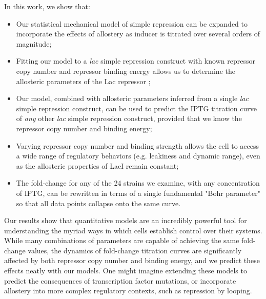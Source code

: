 In this work, we show that:  
\begin{itemize}
	\item Our statistical mechanical model of simple repression can be expanded to incorporate the effects of allostery as inducer is titrated over several orders of magnitude;
	\item Fitting our model to a \textit{lac} simple repression construct with known repressor copy number and repressor binding energy allows us to determine the allosteric parameters of the Lac repressor ;
	\item Our model, combined with allosteric parameters inferred from a single \textit{lac} simple repression construct, can be used to predict the IPTG titration curve of \textit{any} other \textit{lac} simple repression construct, provided that we know the repressor copy number and binding energy;
	\item Varying repressor copy number and binding strength allows the cell to access a wide range of regulatory behaviors (e.g. leakiness and dynamic range), even as the allosteric properties of LacI remain constant;
	\item The fold-change for any of the 24 strains we examine, with any concentration of IPTG, can be rewritten in terms of a single fundamental "Bohr parameter" so that all data points collapse onto the same curve. 
\end{itemize}
Our results show that quantitative models are an incredibly powerful tool for
understanding the myriad ways in which cells establish control over their
systems. While many combinations of parameters are capable of achieving the same
fold-change values, the dynamics of fold-change titration curves are
significantly affected by both repressor copy number and binding energy, and we
predict these effects neatly with our models. One might imagine extending these
models to predict the consequences of transcription factor mutations, or
incorporate allostery into more complex regulatory contexts, such as repression
by looping.

